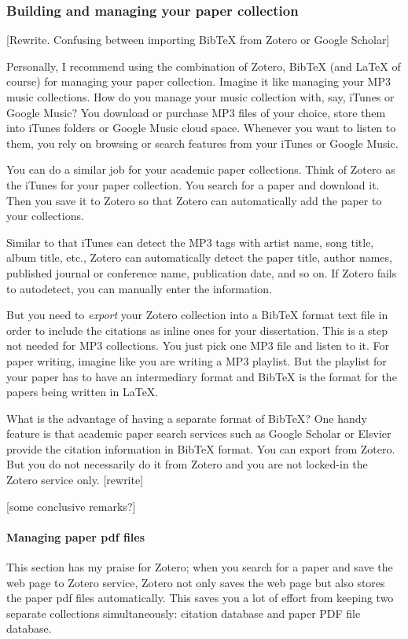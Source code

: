 \documentclass[11pt]{article}
\begin{document}
\subsubsection{Building and managing your paper collection}

[Rewrite. Confusing between importing BibTeX from Zotero or Google Scholar]

Personally, I recommend using the combination of Zotero, BibTeX (and LaTeX of
course) for managing your paper collection. Imagine it like managing your MP3
music collections. How do you manage your music collection with, say, iTunes
or Google Music? You download or purchase MP3 files of your choice, store them
into iTunes folders or Google Music cloud space. Whenever you want to listen
to them, you rely on browsing or search features from your iTunes or Google
Music.

You can do a similar job for your academic paper collections. Think of
Zotero as the iTunes for your paper collection. You search for a paper and
download it. Then you save it to Zotero so that Zotero can automatically add
the paper to your collections. 

Similar to that iTunes can detect the MP3 tags with artist name, song title,
album title, etc., Zotero can automatically detect the paper title, author
names, published journal or conference name, publication date, and so on. If
Zotero fails to autodetect, you can manually enter the information.

But you need to \emph{export} your Zotero collection into a BibTeX format
text file in order to include the citations as inline ones for your
dissertation. This is a step not needed for MP3 collections. You just pick one
MP3 file and listen to it. For paper writing, imagine like you are writing a
MP3 playlist. But the playlist for your paper has to have an intermediary
format and BibTeX is the format for the papers being written in LaTeX.

What is the advantage of having a separate format of BibTeX? One handy feature is
that academic paper search services such as Google Scholar or Elsvier provide
the citation information in BibTeX format. You can export from Zotero. But you
do not necessarily do it from Zotero and you are not locked-in the Zotero
service only. [rewrite]

[some conclusive remarks?]

\paragraph{Managing paper pdf files}
This section has my praise for Zotero; when you search for a paper and
save the web page to Zotero service, Zotero not only saves the web page
but also stores the paper pdf files automatically. This saves you a lot
of effort from keeping two separate collections simultaneously: citation
database and paper PDF file database.
\end{document}
